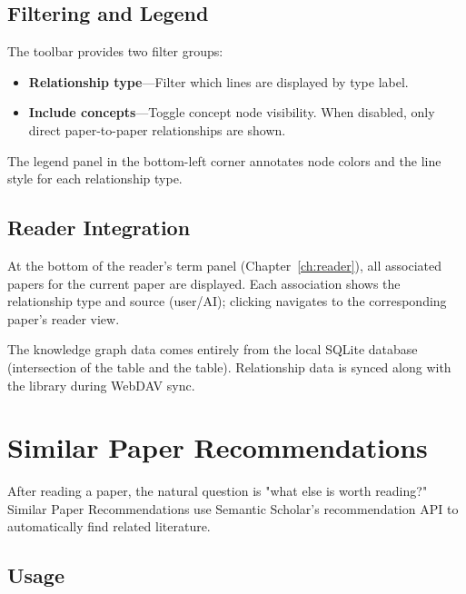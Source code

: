 \section{Filtering and Legend}

The toolbar provides two filter groups:

\begin{itemize}
  \item \textbf{Relationship type}---Filter which lines are displayed by type label.
  \item \textbf{Include concepts}---Toggle concept node visibility. When disabled, only direct
    paper-to-paper relationships are shown.
\end{itemize}

The legend panel in the bottom-left corner annotates node colors and the line style for each
relationship type.

\section{Reader Integration}

At the bottom of the reader's term panel (Chapter~\ref{ch:reader}), all associated papers for the
current paper are displayed. Each association shows the relationship type and source (user/AI);
clicking navigates to the corresponding paper's reader view.

\begin{tipbox}
The knowledge graph data comes entirely from the local SQLite database (intersection of the
 table and the  table). Relationship data is synced along
with the library during WebDAV sync.
\end{tipbox}

\chapter{Similar Paper Recommendations}
\label{ch:similar}

After reading a paper, the natural question is "what else is worth reading?" Similar Paper
Recommendations use Semantic Scholar's recommendation API to automatically find related literature.

\section{Usage}

